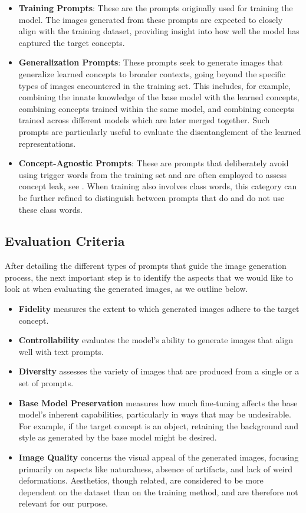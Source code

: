 \begin{itemize}
\item \textbf{Training Prompts}: These are the prompts originally used for training the model. The images generated from these prompts are expected to closely align with the training dataset, providing insight into how well the model has captured the target concepts.
\item \textbf{Generalization Prompts}:
These prompts seek to generate images that generalize learned concepts to broader contexts, going beyond the specific types of images encountered in the training set.
This includes, for example, combining the innate knowledge of the base model with the learned concepts,
combining concepts trained within the same model, and combining concepts trained across different models which are later merged together.
Such prompts are particularly useful to evaluate the disentanglement of the learned representations.
\item \textbf{Concept-Agnostic Prompts}: These are prompts that deliberately avoid using trigger words from the training set and are often employed to assess concept leak, see \eg \citet{kumari2023multi}. When training also involves class words, this category can be further refined to distinguish between prompts that do and do not use these class words.
\end{itemize}



\subsection{Evaluation Criteria}
\label{subsec:eval-criteria}

After detailing the different types of prompts that guide the image generation process, the next important step is to identify the aspects that we would like to look at when evaluating the generated images, as we outline below.

\begin{itemize}
\item \textbf{Fidelity} measures the extent to which generated images adhere to the target concept.
\item \textbf{Controllability} evaluates the model's ability to generate images that align well with text prompts.
\item \textbf{Diversity} assesses the variety of images that are produced from a single or a set of prompts.
\item \textbf{Base Model Preservation} measures how much fine-tuning affects the base model's inherent capabilities, particularly in ways that may be undesirable. For example, if the target concept is an object, retaining the background and style as generated by the base model might be desired.
\item \textbf{Image Quality} concerns the visual appeal of the generated images, focusing primarily on aspects like naturalness, absence of artifacts, and lack of weird deformations. Aesthetics, though related, are considered to be more dependent on the dataset than on the training method, and are therefore not relevant for our purpose.
\end{itemize}

